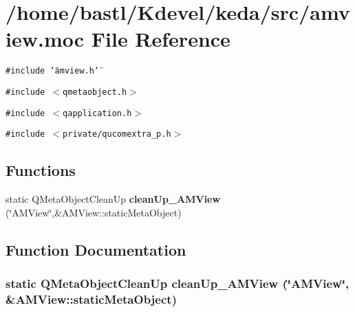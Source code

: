 \section{/home/bastl/Kdevel/keda/src/amview.moc File Reference}
\label{amview_8moc}
{\tt \#include \char`\"{}amview.h\char`\"{}}\par
{\tt \#include $<$qmetaobject.h$>$}\par
{\tt \#include $<$qapplication.h$>$}\par
{\tt \#include $<$private/qucomextra\_\-p.h$>$}\par
\subsection*{Functions}
\begin{CompactItemize}
\item 
static QMeta\-Object\-Clean\-Up {\bf clean\-Up\_\-AMView} (\char`\"{}AMView\char`\"{},\&AMView::static\-Meta\-Object)
\end{CompactItemize}


\subsection{Function Documentation}
\subsubsection{\setlength{\rightskip}{0pt plus 5cm}static QMeta\-Object\-Clean\-Up clean\-Up\_\-AMView (\char`\"{}AMView\char`\"{}, \&AMView::static\-Meta\-Object)\hspace{0.3cm}{\tt  [static]}}\label{amview_8moc_12d79ce108360262534cad42000ce291}



